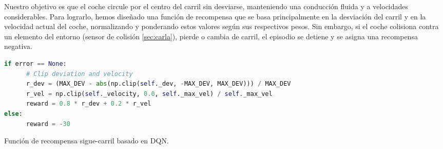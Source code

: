 Nuestro objetivo es que el coche circule por el centro del carril sin desviarse, manteniendo una conducción fluida y a velocidades considerables. Para lograrlo, hemos diseñado una función de recompensa que se basa principalmente en la desviación del carril y en la velocidad actual del coche, normalizando y ponderando estos valores según sus respectivos pesos. Sin embargo, si el coche colisiona contra un elemento del entorno (sensor de colisión \ref{sec:carla}), pierde o cambia de carril, el episodio se detiene y se asigna una recompensa negativa.

\begin{code}[h]
\begin{lstlisting}[language=Python]
if error == None:
      # Clip deviation and velocity
      r_dev = (MAX_DEV - abs(np.clip(self._dev, -MAX_DEV, MAX_DEV))) / MAX_DEV
      r_vel = np.clip(self._velocity, 0.0, self._max_vel) / self._max_vel
      reward = 0.8 * r_dev + 0.2 * r_vel
else:
      reward = -30
\end{lstlisting}
\caption[Función de recompensa sigue-carril basado en \ac{DQN}]{Función de recompensa sigue-carril basado en \ac{DQN}.}
\label{cod:rew_dqn}
\end{code}

